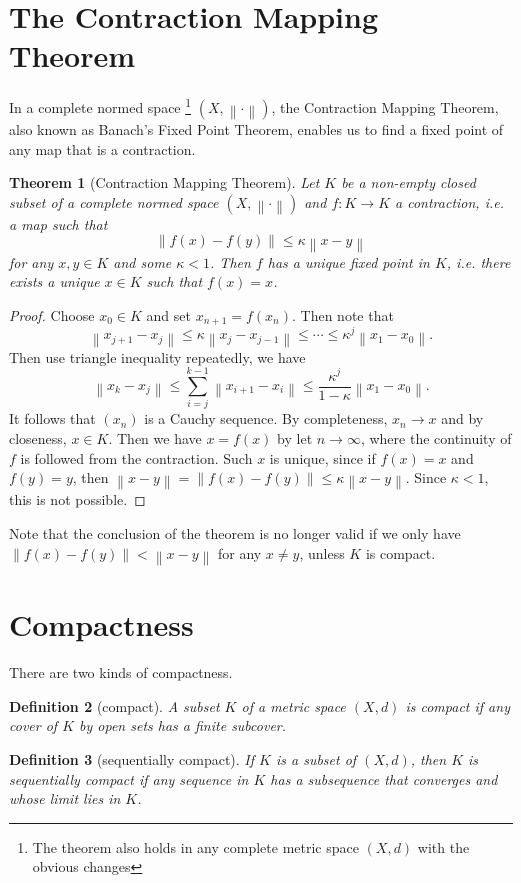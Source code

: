 \documentclass[12pt,a4paper]{article}
\numberwithin{equation}{section}
\theoremstyle{mystyle}
\newtheorem{definition}{Definition}[section]
\newtheorem{theorem}[definition]{Theorem}
\newcommand{\norm}[1]{\left\lVert #1 \right\rVert}
\begin{document}
	\section{The Contraction Mapping Theorem}
	In a complete normed space
	\footnote{The theorem also holds in any complete metric space $(X,d)$ with the obvious changes}
	$(X,\norm{\cdot})$, the Contraction Mapping Theorem, also known as Banach's Fixed Point Theorem, enables us to find a fixed point of any map that is a contraction.
	\begin{theorem}[Contraction Mapping Theorem]
		Let $K$ be a non-empty closed subset of a complete normed space $(X,\norm{\cdot})$ and $f: K\to K$ a contraction, i.e. a map such that
		$$
		\norm{f(x)-f(y)}\leq \kappa \norm{x-y}
		$$
		for any $x,y\in K$ and some $\kappa<1$. Then $f$ has a unique fixed point in $K$, i.e. there exists a unique $x\in K$ such that $f(x)=x$.
	\end{theorem}
	\begin{proof}
		Choose $x_0\in K$ and set $x_{n+1}=f(x_n)$. Then note that
		$$
		\norm{x_{j+1}-x_j}\leq \kappa \norm{x_j-x_{j-1}}\leq \cdots \leq \kappa^j \norm{x_1-x_0}.
		$$
		Then use triangle inequality repeatedly, we have
		$$
		\norm{x_k-x_j}\leq \sum_{i=j}^{k-1}\norm{x_{i+1}-x_i}\leq \frac{\kappa^j}{1-\kappa}\norm{x_1-x_0}.
		$$
		It follows that $(x_n)$ is a Cauchy sequence. By completeness, $x_n\to x$ and by closeness, $x\in K$. Then we have $x=f(x)$ by let $n\to\infty$, where the continuity of $f$ is followed from the contraction. Such $x$ is unique, since if $f(x)=x$ and $f(y)=y$, then $\norm{x-y}=\norm{f(x)-f(y)}\leq \kappa \norm{x-y}$. Since $\kappa<1$, this is not possible.
	\end{proof}
	
	
	Note that the conclusion of the theorem is no longer valid if we only have $\norm{f(x)-f(y)}<\norm{x-y}$ for any $x\neq y$, unless $K$ is compact.
	
	\section{Compactness}
	There are two kinds of compactness. 
	\begin{definition}[compact]
		A subset $K$ of a metric space $(X,d)$ is \emph{compact} if any cover of $K$ by open sets has a finite subcover.
	\end{definition}
	\begin{definition}[sequentially compact]
		If $K$ is a subset of $(X,d)$, then $K$ is \emph{sequentially compact} if any sequence in $K$ has a subsequence that converges and whose limit lies in $K$.
	\end{definition}
	
\end{document}
